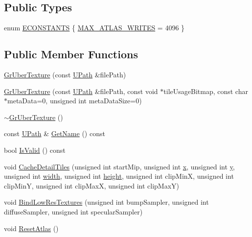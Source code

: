 \subsection*{Public Types}
\begin{CompactItemize}
\item 
enum \hyperlink{class_gr_uber_texture_cf01f354c19dd4a9b9f75f10a61ea3f7}{ECONSTANTS} \{ \hyperlink{class_gr_uber_texture_cf01f354c19dd4a9b9f75f10a61ea3f76604deb9de1a47ec948a512b8b4ee5f4}{MAX\_\-ATLAS\_\-WRITES} =  4096
 \}
\subsection*{Public Member Functions}
\begin{CompactItemize}
\item 
\hyperlink{class_gr_uber_texture_8609b300da5232cf6e8ebdfe7b90aac5}{GrUberTexture} (const \hyperlink{class_u_path}{UPath} \&filePath)
\item 
\hyperlink{class_gr_uber_texture_0e23ddce6edf3799c7f6674609f69161}{GrUberTexture} (const \hyperlink{class_u_path}{UPath} \&filePath, const void $\ast$tileUsageBitmap, const char $\ast$metaData=0, unsigned int metaDataSize=0)
\item 
\hyperlink{class_gr_uber_texture_56e4aea92ddd87bcf5b87915a6673513}{$\sim$GrUberTexture} ()
\item 
const \hyperlink{class_u_path}{UPath} \& \hyperlink{class_gr_uber_texture_09ce3a1b790e26b3e5ad49b04e56ec23}{GetName} () const 
\item 
bool \hyperlink{class_gr_uber_texture_5ed66bd64c78acc1976f4819151a0d9c}{IsValid} () const 
\item 
void \hyperlink{class_gr_uber_texture_066a12f3119df39f9d3ba6140f41f419}{CacheDetailTiles} (unsigned int startMip, unsigned int \hyperlink{wglext_8h_d77deca22f617d3f0e0eb786445689fc}{x}, unsigned int \hyperlink{wglext_8h_9298c7ad619074f5285b32c6b72bfdea}{y}, unsigned int \hyperlink{wglext_8h_e6531b1788ca42a9ae8155b0c52e7630}{width}, unsigned int \hyperlink{wglext_8h_b2e63df950c3789599e1e43f477bc9e3}{height}, unsigned int clipMinX, unsigned int clipMinY, unsigned int clipMaxX, unsigned int clipMaxY)
\item 
void \hyperlink{class_gr_uber_texture_13ff60984b63487fa9532e0668acafbb}{BindLowResTextures} (unsigned int bumpSampler, unsigned int diffuseSampler, unsigned int specularSampler)
\item 
void \hyperlink{class_gr_uber_texture_7052df4bf8cbc24f0e9ef47265fd5015}{ResetAtlas} ()
\end{CompactItemize}



\end{CompactItemize}
